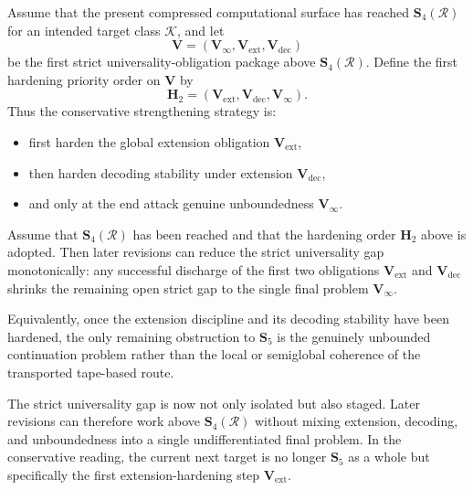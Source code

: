 \begin{definition}
Assume that the present compressed computational surface has reached \(\mathbf S_4(\mathcal R)\) for an intended target class \(\mathcal K\), and let
\[
\mathbf V=(\mathbf V_\infty,\mathbf V_{\mathrm{ext}},\mathbf V_{\mathrm{dec}})
\]
be the first strict universality-obligation package above \(\mathbf S_4(\mathcal R)\).
Define the first hardening priority order on \(\mathbf V\) by
\[
\mathbf H_2=(\mathbf V_{\mathrm{ext}},\mathbf V_{\mathrm{dec}},\mathbf V_\infty).
\]
Thus the conservative strengthening strategy is:
\begin{itemize}[leftmargin=2em]
  \item first harden the global extension obligation \(\mathbf V_{\mathrm{ext}}\),
  \item then harden decoding stability under extension \(\mathbf V_{\mathrm{dec}}\),
  \item and only at the end attack genuine unboundedness \(\mathbf V_\infty\).
\end{itemize}
\end{definition}

\begin{proposition}
Assume that \(\mathbf S_4(\mathcal R)\) has been reached and that the hardening order \(\mathbf H_2\) above is adopted. Then later revisions can reduce the strict universality gap monotonically: any successful discharge of the first two obligations \(\mathbf V_{\mathrm{ext}}\) and \(\mathbf V_{\mathrm{dec}}\) shrinks the remaining open strict gap to the single final problem \(\mathbf V_\infty\).

Equivalently, once the extension discipline and its decoding stability have been hardened, the only remaining obstruction to \(\mathbf S_5\) is the genuinely unbounded continuation problem rather than the local or semiglobal coherence of the transported tape-based route.
\end{proposition}

\begin{corollary}
The strict universality gap is now not only isolated but also staged. Later revisions can therefore work above \(\mathbf S_4(\mathcal R)\) without mixing extension, decoding, and unboundedness into a single undifferentiated final problem. In the conservative reading, the current next target is no longer \(\mathbf S_5\) as a whole but specifically the first extension-hardening step \(\mathbf V_{\mathrm{ext}}\).
\end{corollary}


